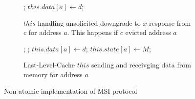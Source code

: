 \begin{figure}
\begin{subfigure}{\linewidth}
\begin{boxedminipage}{\linewidth}
\begin{algorithmic}
    \State \receive{} ;
    \State $this.data[a] \gets d$;
  \EndIf
\EndProc
\end{algorithmic}
\end{boxedminipage}
\caption{$this$ handling unsolicited downgrade to $x$ response from $c$ for
address $a$. This happens if $c$ evicted address $a$}
\label{uResp}
\end{subfigure}

\begin{subfigure}{\linewidth}
\begin{boxedminipage}{\linewidth}
\begin{algorithmic}
  \State \send{} ;
  \State \receive{} ;
  \State $this.data[a] \gets d$;
  \State $this.state[a] \gets M$;
\EndProc
\end{algorithmic}
\end{boxedminipage}
\caption{Last-Level-Cache $this$ sending and receivging data from memory for
address $a$}
\label{uResp}
\end{subfigure}

\caption{Non atomic implementation of MSI protocol}
\label{realistic}
\end{figure}

